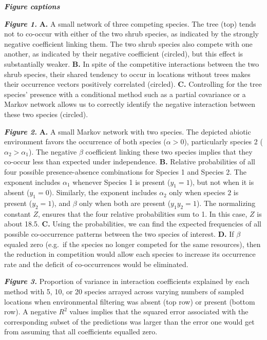 \documentclass[12pt,]{article}
\begin{document}
\begin{spacing}{1.9}
\begin{flushleft}
\textbf{\emph{Figure captions}}

\textbf{\emph{Figure 1.}} \textbf{A.} A small network of three competing
species. The tree (top) tends not to co-occur with either of the two
shrub species, as indicated by the strongly negative coefficient linking
them. The two shrub species also compete with one another, as indicated
by their negative coefficient (circled), but this effect is
substantially weaker. \textbf{B.} In spite of the competitive
interactions between the two shrub species, their shared tendency to
occur in locations without trees makes their occurrence vectors
positively correlated (circled). \textbf{C.} Controlling for the tree
species' presence with a conditional method such as a partial covariance
or a Markov network allows us to correctly identify the negative
interaction between these two species (circled).

\textbf{\emph{Figure 2.}} \textbf{A.} A small Markov network with two
species. The depicted abiotic environment favors the occurrence of both
species (\(\alpha >0\)), particularly species 2
(\(\alpha_2 > \alpha_1\)). The negative \(\beta\) coefficient linking
these two species implies that they co-occur less than expected under
independence. \textbf{B.} Relative probabilities of all four possible
presence-absence combinations for Species 1 and Species 2. The exponent
includes \(\alpha_1\) whenever Species 1 is present (\(y_1 = 1\)), but
not when it is absent (\(y_1 = 0\)). Similarly, the exponent includes
\(\alpha_2\) only when species \(2\) is present (\(y_2 = 1\)), and
\(\beta\) only when both are present (\(y_1y_2 = 1\)). The normalizing
constant \(Z\), ensures that the four relative probabilities sum to 1.
In this case, \(Z\) is about 18.5. \textbf{C.} Using the probabilities,
we can find the expected frequencies of all possible co-occurrence
patterns between the two species of interest. \textbf{D.} If \(\beta\)
equaled zero (e.g.~if the species no longer competed for the same
resources), then the reduction in competition would allow each species
to increase its occurrence rate and the deficit of co-occurrences would
be eliminated.

\textbf{\emph{Figure 3.}} Proportion of variance in interaction
coefficients explained by each method with 5, 10, or 20 species arrayed
across varying numbers of sampled locations when environmental filtering
was absent (top row) or present (bottom row). A negative \(R^2\) values
implies that the squared error associated with the corresponding subset
of the predictions was larger than the error one would get from assuming
that all coefficients equalled zero.

\end{flushleft}
\end{spacing}
\end{document}
